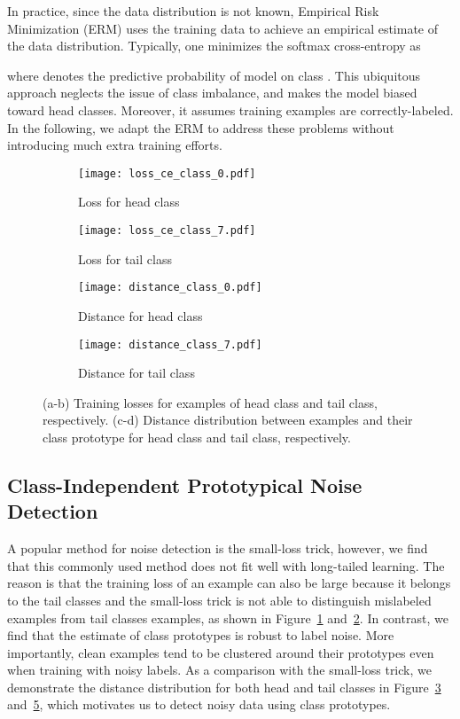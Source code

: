\documentclass{article}
\begin{document}
In practice, since the data distribution is not known, Empirical Risk Minimization (ERM) uses the training data to achieve an empirical estimate of the data distribution. Typically, one minimizes the softmax cross-entropy as

where  denotes the predictive probability of model  on class . This ubiquitous approach neglects the issue of class imbalance, and makes the model biased toward head classes. Moreover, it assumes training examples are correctly-labeled. In the following, we adapt the ERM to address these problems without introducing much extra training efforts.

\begin{figure}[t]
    \centering
    \begin{subfigure}[b]{0.236\textwidth}
        \centering
        \texttt{[image: loss\_ce\_class\_0.pdf]}
        \caption{ Loss for head class}
        \label{fig:loss_class_0}
    \end{subfigure}
    \begin{subfigure}[b]{0.231\textwidth}
        \centering
        \texttt{[image: loss\_ce\_class\_7.pdf]}
        \caption{ Loss for tail class}
        \label{fig:loss_class_7}
    \end{subfigure}
    \begin{subfigure}[b]{0.256\textwidth}
        \centering
        \texttt{[image: distance\_class\_0.pdf]} 
        \caption{Distance for head class}\label{fig:distance_class_0}
    \end{subfigure}
    \begin{subfigure}[b]{0.256\textwidth}
        \centering
        \texttt{[image: distance\_class\_7.pdf]} 
        \caption{Distance for tail class}\label{fig:distance_class_7}
    \end{subfigure}
    \caption{(a-b) Training losses for examples of head class and tail class, respectively. (c-d) Distance distribution between examples and their class prototype for head class and tail class, respectively.}
\end{figure}

\subsection{Class-Independent Prototypical Noise Detection}
A popular method for noise detection is the small-loss trick, however, we find that this commonly used method does not fit well with long-tailed learning. The reason is that the training loss of an example can also be large because it belongs to the tail classes and the small-loss trick is not able to distinguish mislabeled examples from tail classes examples, as shown in Figure~\ref{fig:loss_class_0} and~\ref{fig:loss_class_7}. 
In contrast, we find that the estimate of class prototypes is robust to label noise. More importantly, clean examples tend to be clustered around their prototypes even when training with noisy labels. As a comparison with the small-loss trick, we demonstrate the distance distribution for both head and tail classes in Figure~\ref{fig:distance_class_0} and~\ref{fig:distance_class_7}, which motivates us to detect noisy data using class prototypes. 
\end{document}
